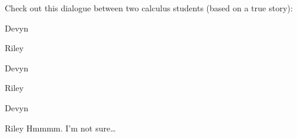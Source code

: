 \documentclass{ximera}
\title[Break-Ground:]{}
\begin{document}
\begin{abstract}
\end{abstract}
\maketitle

Check out this dialogue between two calculus students (based on a true
story):

\begin{dialogue}
\item[Devyn] 
\item[Riley] 
\item[Devyn] 
\item[Riley] 
\item[Devyn] 
\item[Riley] Hmmmm. I'm not sure\dots
\end{dialogue}








\end{document}

